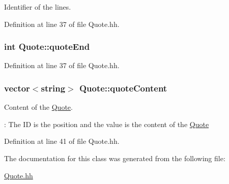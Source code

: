 Identifier of the lines. 



Definition at line 37 of file Quote.\+hh.

\subsubsection[{\texorpdfstring{quote\+End}{quoteEnd}}]{\setlength{\rightskip}{0pt plus 5cm}int Quote\+::quote\+End\hspace{0.3cm}{\ttfamily [private]}}\hypertarget{class_quote_aa5953a477b96183c8dc2fc8a42001c29}{}\label{class_quote_aa5953a477b96183c8dc2fc8a42001c29}


Definition at line 37 of file Quote.\+hh.

\subsubsection[{\texorpdfstring{quote\+Content}{quoteContent}}]{\setlength{\rightskip}{0pt plus 5cm}vector$<$string$>$ Quote\+::quote\+Content\hspace{0.3cm}{\ttfamily [private]}}\hypertarget{class_quote_a0ffcb584920e14d7dd5c45820997f989}{}\label{class_quote_a0ffcb584920e14d7dd5c45820997f989}


Content of the \hyperlink{class_quote}{Quote}. 

\+: The ID is the position and the value is the content of the \hyperlink{class_quote}{Quote} 

Definition at line 41 of file Quote.\+hh.



The documentation for this class was generated from the following file\+:\begin{DoxyCompactItemize}
\item 
\hyperlink{_quote_8hh}{Quote.\+hh}\end{DoxyCompactItemize}
